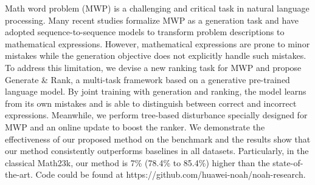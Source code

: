 Math word problem (MWP) is a challenging and critical task in natural language processing. Many recent studies formalize MWP as a generation task and have adopted sequence-to-sequence models to transform problem descriptions to mathematical expressions. However, mathematical expressions are prone to minor mistakes while the generation objective does not explicitly handle such mistakes. To address this limitation, we devise a new ranking task for MWP and propose Generate \& Rank, a multi-task framework based on a generative pre-trained language model. By joint training with generation and ranking, the model learns from its own mistakes and is able to distinguish between correct and incorrect expressions. Meanwhile, we perform tree-based disturbance specially designed for MWP and an online update to boost the ranker. We demonstrate the effectiveness of our proposed method on the benchmark and the results show that our method consistently outperforms baselines in all datasets. Particularly, in the classical Math23k, our method is 7\% (78.4\% to 85.4\%) higher than the state-of-the-art. Code could be found at https://github.com/huawei-noah/noah-research.
